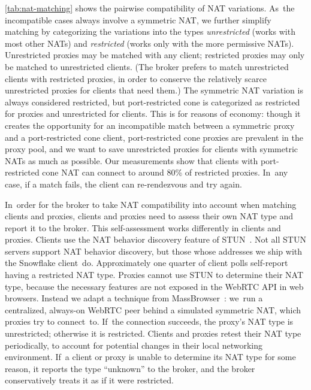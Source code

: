 \documentclass[letterpaper,twocolumn]{article}
\newcommand{\firstterm}[1]{\textit{#1}}
\begin{document}
\autoref{tab:nat-matching}
shows the pairwise compatibility of NAT variations.
As~the incompatible cases always involve a symmetric NAT,
we further simplify matching by categorizing the variations into the types
\firstterm{unrestricted} (works with most other NATs) and
\firstterm{restricted} (works only with the more permissive NATs).
Unrestricted proxies may be matched with any client;
restricted proxies may only be matched to unrestricted clients.
(The broker prefers to match unrestricted clients with restricted proxies,
in order to conserve the relatively scarce unrestricted proxies
for clients that need them.)
The symmetric NAT variation is always considered restricted,
but port-restricted cone is categorized as
restricted for proxies and unrestricted for clients.
This is for reasons of economy:
though it creates the opportunity for an incompatible match
between a symmetric proxy and a port-restricted cone client,
port-restricted cone proxies are prevalent in the proxy pool,
and we want to save unrestricted proxies for clients
with symmetric NATs as much as possible.
Our measurements show that clients with port-restricted cone NAT
can connect to around 80\%
of restricted proxies.
In~any case, if a match fails, the client can re-rendezvous and try again.

In~order for the broker to take NAT compatibility into account
when matching clients and proxies,
clients and proxies need to assess their own NAT type
and report it to the broker.
This self-assessment works differently in clients and proxies.
Clients use the NAT behavior discovery feature of STUN~\cite{rfc5780}.
Not all STUN servers support NAT behavior discovery,
but those whose addresses we ship with the Snowflake client~do.
Approximately one quarter of client polls
self-report having a restricted NAT type.
Proxies cannot use STUN to determine their NAT type,
because the necessary features are not exposed
in the WebRTC API in web browsers.
Instead
we adapt a technique from MassBrowser~\cite[\S \mbox{V-A}]{Nasr2020a}:
we~run a centralized, always-on WebRTC peer behind a simulated symmetric NAT,
which proxies try to connect~to.
If~the connection succeeds, the proxy's NAT type is unrestricted;
otherwise it is restricted.
Clients and proxies retest their NAT type periodically,
to account for potential changes in their local networking environment.
If~a client or proxy is unable to determine its NAT type for some reason,
it reports the type ``unknown'' to the broker,
and the broker conservatively treats it as if it were restricted.
\end{document}
